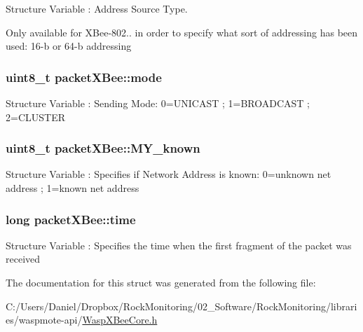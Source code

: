 Structure Variable \+: Address Source Type. 

Only available for X\+Bee-\/802.. in order to specify what sort of addressing has been used\+: 16-\/b or 64-\/b addressing 
\subsubsection[{\texorpdfstring{mode}{mode}}]{\setlength{\rightskip}{0pt plus 5cm}uint8\+\_\+t packet\+X\+Bee\+::mode}\hypertarget{structpacket_x_bee_ac730f3c445ec495b71054a8ccad72f4a}{}\label{structpacket_x_bee_ac730f3c445ec495b71054a8ccad72f4a}
Structure Variable \+: Sending Mode\+: 0=U\+N\+I\+C\+A\+ST ; 1=B\+R\+O\+A\+D\+C\+A\+ST ; 2=C\+L\+U\+S\+T\+ER 
\subsubsection[{\texorpdfstring{M\+Y\+\_\+known}{MY_known}}]{\setlength{\rightskip}{0pt plus 5cm}uint8\+\_\+t packet\+X\+Bee\+::\+M\+Y\+\_\+known}\hypertarget{structpacket_x_bee_adad7cd3286384979da957eefe7497c36}{}\label{structpacket_x_bee_adad7cd3286384979da957eefe7497c36}
Structure Variable \+: Specifies if Network Address is known\+: 0=unknown net address ; 1=known net address 
\subsubsection[{\texorpdfstring{time}{time}}]{\setlength{\rightskip}{0pt plus 5cm}long packet\+X\+Bee\+::time}\hypertarget{structpacket_x_bee_a5223f89f7bc1787d2546c850363777d1}{}\label{structpacket_x_bee_a5223f89f7bc1787d2546c850363777d1}
Structure Variable \+: Specifies the time when the first fragment of the packet was received 

The documentation for this struct was generated from the following file\+:\begin{DoxyCompactItemize}
\item 
C\+:/\+Users/\+Daniel/\+Dropbox/\+Rock\+Monitoring/02\+\_\+\+Software/\+Rock\+Monitoring/libraries/waspmote-\/api/\hyperlink{_wasp_x_bee_core_8h}{Wasp\+X\+Bee\+Core.\+h}\end{DoxyCompactItemize}
